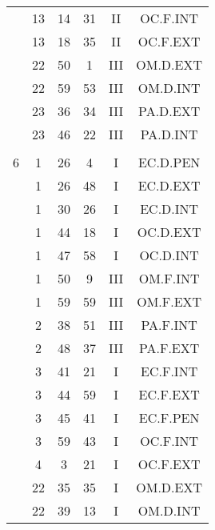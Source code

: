\documentclass[12pt, a4paper]{article}
\begin{document}
\begin{multicols}{3}
{\begin{tabular}{c c c c c c}
	 	 	 	 & 13 & 14 & 31 & II & OC.F.INT\\%
	 	 	 	 & 13 & 18 & 35 & II & OC.F.EXT\\%
	 	 	 	 & 22 & 50 & 1 & III & OM.D.EXT\\%
	 	 	 	 & 22 & 59 & 53 & III & OM.D.INT\\%
	 	 	 	 & 23 & 36 & 34 & III & PA.D.EXT\\%
	 	 	 	 & 23 & 46 & 22 & III & PA.D.INT\\%
	 	 	 	 & & & & & \\%
	 	 	 	6 & 1 & 26 & 4 & I & EC.D.PEN\\%
	 	 	 	 & 1 & 26 & 48 & I & EC.D.EXT\\%
	 	 	 	 & 1 & 30 & 26 & I & EC.D.INT\\%
	 	 	 	 & 1 & 44 & 18 & I & OC.D.EXT\\%
	 	 	 	 & 1 & 47 & 58 & I & OC.D.INT\\%
	 	 	 	 & 1 & 50 & 9 & III & OM.F.INT\\%
	 	 	 	 & 1 & 59 & 59 & III & OM.F.EXT\\%
	 	 	 	 & 2 & 38 & 51 & III & PA.F.INT\\%
	 	 	 	 & 2 & 48 & 37 & III & PA.F.EXT\\%
	 	 	 	 & 3 & 41 & 21 & I & EC.F.INT\\%
	 	 	 	 & 3 & 44 & 59 & I & EC.F.EXT\\%
	 	 	 	 & 3 & 45 & 41 & I & EC.F.PEN\\%
	 	 	 	 & 3 & 59 & 43 & I & OC.F.INT\\%
	 	 	 	 & 4 & 3 & 21 & I & OC.F.EXT\\%
	 	 	 	 & 22 & 35 & 35 & I & OM.D.EXT\\%
	 	 	 	 & 22 & 39 & 13 & I & OM.D.INT\\%

\end{tabular}}
\end{multicols}
\end{document}
